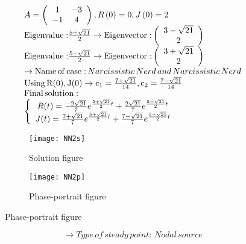 \documentclass[a4paper]{article}
\begin{document}
\[\begin{array}{l}
A = \left( {\begin{array}{*{20}{c}}
1&{ - 3}\\
{ - 1}&4
\end{array}} \right),R\left( 0 \right) = 0,J\left( 0 \right) = 2\\
{\rm{Eigenvalue:}}\frac{{5 + \sqrt {21} }}{2} \to {\rm{Eigenvector:}}\left( {\begin{array}{*{20}{c}}
{3 - \sqrt {21} }\\
2
\end{array}} \right)\\
{\rm{Eigenvalue:}}\frac{{5 - \sqrt {21} }}{2} \to {\rm{Eigenvector:}}\left( {\begin{array}{*{20}{c}}
{3 + \sqrt {21} }\\
2
\end{array}} \right)\\
 \to {\rm{Name}}\,{\rm{of}}\,{\rm{case:}}\,Narcissistic\,Nerd\,and\,Narcissistic\,Nerd\\
{\rm{Using}}\,{\rm{R(0), J(0)}} \to {{\rm{c}}_1} = \frac{{7 + \sqrt {21} }}{{14}},{\rm{ }}{{\rm{c}}_2} = \frac{{7 - \sqrt {21} }}{{14}}\\
{\rm{Final}}\,{\rm{solution:}}\\
\left\{ {\begin{array}{*{20}{c}}
{R(t) = \frac{{ - 2\sqrt {21} }}{7}{e^{\frac{{5 + \sqrt {21} }}{2}t}} + \frac{{  2\sqrt {21} }}{7}{e^{\frac{{5 - \sqrt {21} }}{2}t}}}\\
{J(t) = \frac{{7 + \sqrt {21} }}{7}{e^{\frac{{5 + \sqrt {21} }}{2}t}} + \frac{{7 - \sqrt {21} }}{7}{e^{\frac{{5 - \sqrt {21} }}{2}t}}}
\end{array}} \right.
\end{array}\]
\begin{figure}[H]
\centering
\begin{subfigure}{.5\textwidth}
  \centering
  \texttt{[image: NN2s]}
  \caption*{Solution figure}
\end{subfigure}%
\begin{subfigure}{.5\textwidth}
  \centering
  \texttt{[image: NN2p]}
  \caption*{Phase-portrait figure}
\end{subfigure}
\end{figure}
\[  \to  Type\,of\,steady\,point:\,Nodal\,source\]
\end{document}

